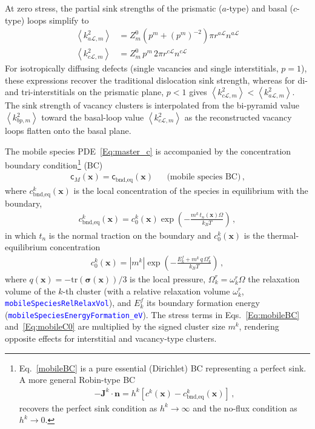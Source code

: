\documentclass{article}
\newcommand{\textttclr}[1]{\textcolor{blue}{\texttt{#1}}}
\newcommand{\spvec}[1]{\bm{\mathsf{#1}}}   %
\begin{document}
At zero stress, the partial sink strengths of the prismatic ($a$-type) and basal ($c$-type) loops simplify to
\begin{align}
\left\langle k^2_{a\mathcal{L},m }\right\rangle &= Z^0_{m}\left( p^m + (p^m)^{-2} \right)\pi r^{a\mathcal{L}} n^{a\mathcal{L}} \label{Eq:asink_strength_simple}\\
\left\langle k^2_{c\mathcal{L},m }\right\rangle &= Z^0_{m}\, p^m\, 2\pi r^{c\mathcal{L}} n^{c\mathcal{L}} \label{Eq:csink_strength_simple}
\end{align}
For isotropically diffusing defects (single vacancies and single interstitials, $p=1$), these expressions recover the traditional dislocation sink strength, whereas for di- and tri-interstitials on the prismatic plane, $p<1$ gives $\left\langle k^2_{c\mathcal{L},m }\right\rangle < \left\langle k^2_{a\mathcal{L},m }\right\rangle$. The sink strength of vacancy clusters is interpolated from the bi-pyramid value $\left\langle k^2_{bp,m }\right\rangle$ toward the basal-loop value $\left\langle k^2_{c\mathcal{L},m }\right\rangle$ as the reconstructed vacancy loops flatten onto the basal plane.



The mobile species PDE~\eqref{Eq:master_c} is accompanied by the concentration boundary condition\footnote{
Eq.~\eqref{mobileBC} is a pure essential (Dirichlet) BC representing a perfect sink. A more general Robin-type BC
\begin{align}
-\bm J^k\cdot \bm n = h^k\left[c^k(\bm x)-c^k_\text{bnd,eq}(\bm x)\right]\, ,
\end{align}
recovers the perfect sink condition as $h^k\rightarrow\infty$ and the no-flux condition as $h^k\rightarrow0$.
}
(BC)
\begin{align}
\spvec{c}_M(\bm x)=\spvec{c}_\text{bnd,eq}(\bm x) && \text{(mobile species BC)}\, ,
\label{mobileBC}
\end{align}
where $c^k_\text{bnd,eq}(\bm x)$ is the local concentration of the species in equilibrium with the boundary,
\begin{align}
c^k_\text{bnd,eq}(\bm x)=c^k_0(\bm x)\exp\left(-\frac{m^k\,t_n(\bm x)\Omega}{k_BT}\right) \, ,
\label{Eq:mobileBC}
\end{align}
in which $t_n$ is the normal traction on the boundary and $c^k_0(\bm x)$ is the thermal-equilibrium concentration
\begin{align}
c^k_0(\bm x)= |m^k|\exp\left(-\frac{E^f_k+m^k\,q\,\Omega_k^r}{k_BT}\right)\, ,
\label{Eq:mobileC0}
\end{align}
where $q(\bm x)=-\text{tr}(\bm\sigma(\bm x))/3$ is the local pressure, $\Omega_k^r=\omega_k^r\Omega$ the relaxation volume of the $k$-th cluster (with a relative relaxation volume $\omega_k^r$, \textttclr{mobileSpeciesRelRelaxVol}), and $E_k^f$ its boundary formation energy (\textttclr{mobileSpeciesEnergyFormation\_eV}). The stress terms in Eqs.~\eqref{Eq:mobileBC} and~\eqref{Eq:mobileC0} are multiplied by the signed cluster size $m^k$, rendering opposite effects for interstitial and vacancy-type clusters.
\end{document}
